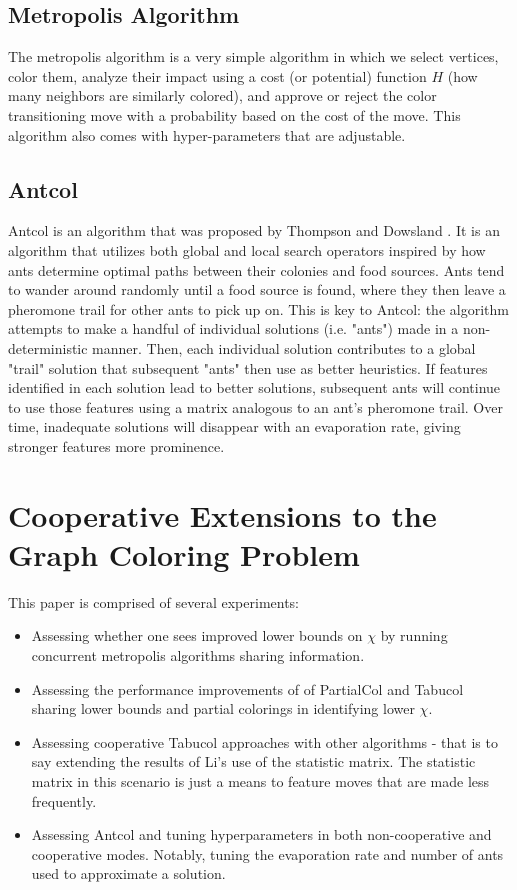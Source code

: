 \documentclass[runningheads]{llncs}
\begin{document}
\subsection{Metropolis Algorithm}
The metropolis algorithm is a very simple algorithm in which we select vertices, color them, analyze their impact using a cost (or potential) function $H$ (how many neighbors are similarly colored), and approve or reject the color transitioning move with a probability based on the cost of the move. This algorithm also comes with hyper-parameters that are adjustable.

\subsection{Antcol}

Antcol is an algorithm that was proposed by Thompson and Dowsland \cite{ant_kj}. It is an algorithm that utilizes both global and local search operators inspired by how ants determine optimal paths between their colonies and food sources. Ants tend to wander around randomly until a food source is found, where they then leave a pheromone trail for other ants to pick up on. This is key to Antcol: the algorithm attempts to make a handful of individual solutions (i.e. "ants") made in a non-deterministic manner. Then, each individual solution contributes to a global "trail" solution that subsequent "ants" then use as better heuristics. If features identified in each solution lead to better solutions, subsequent ants will continue to use those features using a matrix analogous to an ant's pheromone trail. Over time, inadequate solutions will disappear with an evaporation rate, giving stronger features more prominence.

\section{Cooperative Extensions to the Graph Coloring Problem}

This paper is comprised of several experiments:

\begin{itemize}

  \item Assessing whether one sees improved lower bounds on $\chi$ by running concurrent metropolis algorithms sharing information.
  \item Assessing the performance improvements of of PartialCol and Tabucol sharing lower bounds and partial colorings in identifying lower $\chi$.
  \item Assessing cooperative Tabucol approaches with other algorithms - that is to say extending the results of Li's use of the statistic matrix. \cite{https://doi.org/10.5445/ir/1000083192} The statistic matrix in this scenario is just a means to feature moves that are made less frequently.
  \item Assessing Antcol and tuning hyperparameters in both non-cooperative and cooperative modes. Notably, tuning the evaporation rate and number of ants used to approximate a solution.
\end{itemize}
\end{document}
